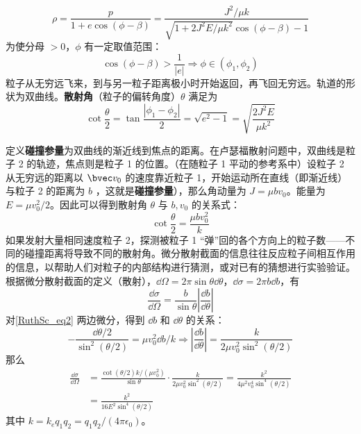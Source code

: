 \begin{equation}
\rho=\frac{p}{1+e\cos(\phi-\beta)}=\frac{J^2/\mu k}{\sqrt{1+2J^2E/\mu k^2}\cos(\phi-\beta)-1}
\end{equation}
为使分母 $>0$，$\phi$ 有一定取值范围：
\begin{equation}
\cos(\phi-\beta)>\frac{1}{|e|}
\Rightarrow \phi \in (\phi_1,\phi_2)
\end{equation}
粒子从无穷远飞来，到与另一粒子距离极小时开始返回，再飞回无穷远。轨道的形状为双曲线。\textbf{散射角}（粒子的偏转角度）$\theta$ 满足为
\begin{equation}
\cot\frac{\theta}{2}=\tan\frac{|\phi_1-\phi_2|}{2} =\sqrt{e^2-1}=\sqrt{\frac{2J^2E}{\mu k^2}}
\end{equation}

定义\textbf{碰撞参量}为双曲线的渐近线到焦点的距离。在卢瑟福散射问题中，双曲线是粒子 2 的轨迹，焦点则是粒子 1 的位置。（在随粒子 1 平动的参考系中）设粒子 2 从无穷远的距离以 $\bvec v_0$ 的速度靠近粒子 1，开始运动所在直线（即渐近线）与粒子 2 的距离为 $b$ ，这就是\textbf{碰撞参量}），那么角动量为 $J=\mu bv_0$。能量为 $E=\mu v_0^2/2$。因此可以得到散射角 $\theta$ 与 $b,v_0$ 的关系式：
\begin{equation}\label{RuthSc_eq2}
\cot \frac{\theta}{2}=\frac{\mu bv_0^2}{k}
\end{equation}
如果发射大量相同速度粒子 2，探测被粒子 1 “弹”回的各个方向上的粒子数——不同的碰撞距离将导致不同的散射角。微分散射截面的信息往往反应粒子间相互作用的信息，以帮助人们对粒子的内部结构进行猜测，或对已有的猜想进行实验验证。根据微分散射截面的定义（散射），$\dd \Omega=2\pi \sin\theta \dd \theta$，$\dd \sigma=2\pi b\dd b$，有
\begin{equation}
\frac{\dd \sigma}{\dd \Omega}=\frac{b}{\sin \theta}\left|\frac{\dd b}{\dd \theta}\right|
\end{equation}
对\autoref{RuthSc_eq2} 两边微分，得到 $\dd b$ 和 $\dd \theta$ 的关系：
\begin{equation}
-\frac{\dd \theta/2}{\sin^2(\theta/2)}=\mu v_0^2\dd b/k\Rightarrow \left|\frac{\dd b}{\dd \theta}\right|=\frac{k}{2\mu v_0^2\sin^2(\theta/2)}
\end{equation}
那么
\begin{equation}
\begin{aligned}
\frac{\dd \sigma}{\dd \Omega}&=\frac{\cot(\theta/2)k/(\mu v_0^2)}{\sin\theta}\cdot \frac{k}{2\mu v_0^2\sin^2(\theta/2)}=\frac{k^2}{4\mu ^2v_0^4\sin^4(\theta/2)}
\\
&=\frac{k^2}{16E^2\sin^4(\theta/2)}
\end{aligned}
\end{equation}
其中 $k=k_eq_1q_2=q_1q_2/(4\pi\epsilon_0)$。
